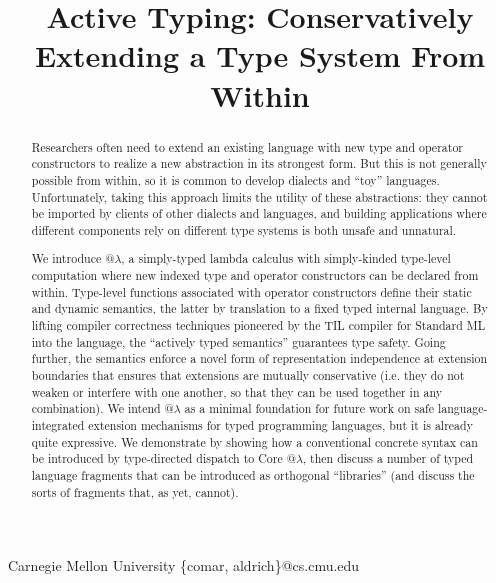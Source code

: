 \documentclass[9pt,preprint]{sigplanconf}
\begin{document}
\conferenceinfo{-}{-} 
\copyrightyear{-} 
\copyrightdata{[to be supplied]} 


\title{Active Typing: Conservatively Extending a Type System From Within}

           {Carnegie Mellon University}
            {\{comar, aldrich\}@cs.cmu.edu}   

\maketitle
\begin{abstract}
Researchers often need to extend an existing language with new type and operator constructors to realize a new abstraction in its strongest form. 
But this is not generally possible from within, so it is common to develop dialects and ``toy'' languages.
Unfortunately, taking this approach limits the utility of these abstractions: they cannot be imported by clients of other dialects and languages, and building applications where different components rely on different type systems is both unsafe and unnatural. 

We introduce @$\lambda$, a simply-typed lambda calculus with simply-kinded type-level computation where new indexed type and operator constructors can be declared  from within. %
Type-level functions associated with operator constructors define their static and dynamic semantics, the latter by translation to a fixed typed internal language. By lifting compiler correctness techniques pioneered by the TIL compiler for Standard ML into the language, the ``actively typed semantics'' guarantees type safety. Going further, the semantics enforce a novel form of representation independence at extension boundaries that ensures that extensions are mutually conservative (i.e. they do not weaken or interfere with one another, so that they can  be used together in any combination). 
We intend @$\lambda$ as a minimal foundation for future work on safe language-integrated extension mechanisms for typed programming languages, but it is already quite expressive. We demonstrate by showing how a conventional concrete syntax can be introduced by type-directed dispatch to Core @$\lambda$, then discuss a number of typed language fragments that can be introduced as orthogonal ``libraries'' (and discuss the sorts of fragments that, as yet, cannot).
\end{abstract}
\end{document}
